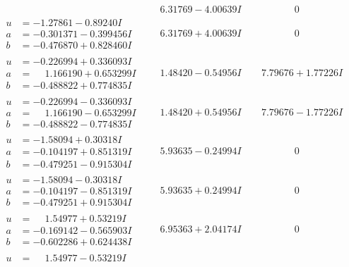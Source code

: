 \documentclass[1p]{elsarticle_modified}
\theoremstyle{definition}
\begin{document}
$$\begin{array}{c|c|c}
 & \phantom{-}6.31769 - 4.00639 I & \phantom{-0.000000 } 0 \\ \hline\begin{aligned}
u &= -1.27861 - 0.89240 I \\
a &= -0.301371 - 0.399456 I \\
b &= -0.476870 + 0.828460 I\end{aligned}
 & \phantom{-}6.31769 + 4.00639 I & \phantom{-0.000000 } 0 \\ \hline\begin{aligned}
u &= -0.226994 + 0.336093 I \\
a &= \phantom{-}1.166190 + 0.653299 I \\
b &= -0.488822 + 0.774835 I\end{aligned}
 & \phantom{-}1.48420 - 0.54956 I & \phantom{-}7.79676 + 1.77226 I \\ \hline\begin{aligned}
u &= -0.226994 - 0.336093 I \\
a &= \phantom{-}1.166190 - 0.653299 I \\
b &= -0.488822 - 0.774835 I\end{aligned}
 & \phantom{-}1.48420 + 0.54956 I & \phantom{-}7.79676 - 1.77226 I \\ \hline\begin{aligned}
u &= -1.58094 + 0.30318 I \\
a &= -0.104197 + 0.851319 I \\
b &= -0.479251 - 0.915304 I\end{aligned}
 & \phantom{-}5.93635 - 0.24994 I & \phantom{-0.000000 } 0 \\ \hline\begin{aligned}
u &= -1.58094 - 0.30318 I \\
a &= -0.104197 - 0.851319 I \\
b &= -0.479251 + 0.915304 I\end{aligned}
 & \phantom{-}5.93635 + 0.24994 I & \phantom{-0.000000 } 0 \\ \hline\begin{aligned}
u &= \phantom{-}1.54977 + 0.53219 I \\
a &= -0.169142 - 0.565903 I \\
b &= -0.602286 + 0.624438 I\end{aligned}
 & \phantom{-}6.95363 + 2.04174 I & \phantom{-0.000000 } 0 \\ \hline\begin{aligned}
u &= \phantom{-}1.54977 - 0.53219 I \\

\end{aligned}
\end{array}$$
\end{document}
